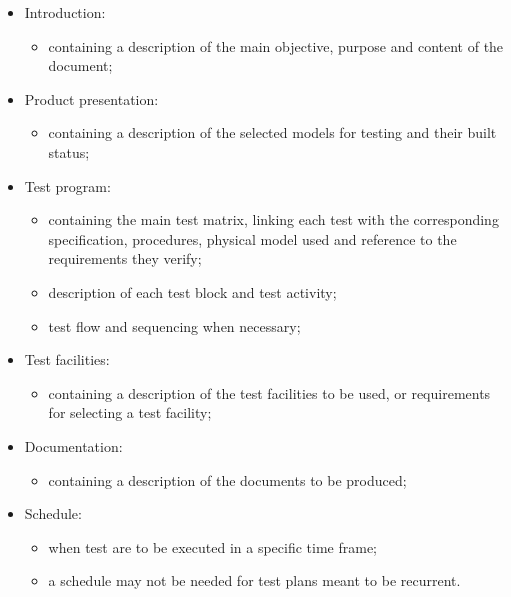 \begin{itemize}
    \item Introduction:
    \begin{itemize}
        \item containing a description of the main objective, purpose and content of the document;
    \end{itemize}

    \item Product presentation:
    \begin{itemize}
        \item containing a description of the selected models for testing and their built status;
    \end{itemize}

    \item Test program:
    \begin{itemize}
        \item containing the main test matrix, linking each test with the corresponding specification, procedures, physical model used and reference to the requirements they verify;
        \item description of each test block and test activity;
        \item test flow and sequencing when necessary;
    \end{itemize}

    \item Test facilities:
    \begin{itemize}
        \item containing a description of the test facilities to be used, or requirements for selecting a test facility;
    \end{itemize}

    \item Documentation:
    \begin{itemize}
        \item containing a description of the documents to be produced;
    \end{itemize}

    \item Schedule:
    \begin{itemize}
        \item when test are to be executed in a specific time frame;
        \item a schedule may not be needed for test plans meant to be recurrent.
    \end{itemize}

\end{itemize}